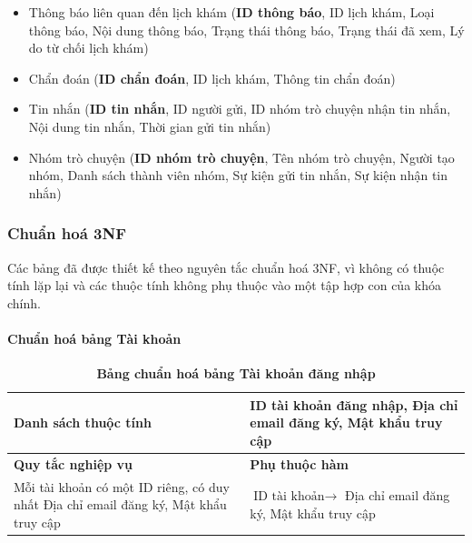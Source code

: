 \begin{itemize}
	\item Thông báo liên quan đến lịch khám (\textbf{ID thông báo}, ID lịch khám, Loại thông báo, Nội dung thông báo, Trạng thái thông báo, Trạng thái đã xem, Lý do từ chối lịch khám)
	\item Chẩn đoán (\textbf{ID chẩn đoán}, ID lịch khám, Thông tin chẩn đoán)
	\item Tin nhắn (\textbf{ID tin nhắn}, ID người gửi, ID nhóm trò chuyện nhận tin nhắn, Nội dung tin nhắn, Thời gian gửi tin nhắn)
	\item Nhóm trò chuyện (\textbf{ID nhóm trò chuyện}, Tên nhóm trò chuyện, Người tạo nhóm, Danh sách thành viên nhóm, Sự kiện gửi tin nhắn, Sự kiện nhận tin nhắn)

\end{itemize}

\subsubsection{Chuẩn hoá 3NF}
Các bảng đã được thiết kế theo nguyên tắc chuẩn hoá 3NF, vì không có thuộc tính lặp lại và các thuộc tính không phụ thuộc vào một tập hợp con của khóa chính.

\paragraph{Chuẩn hoá bảng Tài khoản}
\mbox{}
\begin{table}[H]
	\caption{\bfseries \fontsize{12pt}{0pt}\selectfont Bảng chuẩn hoá bảng Tài khoản đăng nhập}
	\centering
	\begin{tabularx}{0.9\textwidth}{|X|X|}
		\hline
		\textbf{Danh sách thuộc tính} & ID tài khoản đăng nhập, Địa chỉ email đăng ký, Mật khẩu truy cập                                   \\
		\hline
		\textbf{Quy tắc nghiệp vụ}    & \textbf{Phụ thuộc hàm}                                                                             \\
		\hline
		Mỗi tài khoản có một ID riêng, có duy nhất Địa chỉ email đăng ký, Mật khẩu truy cập
		                              & \parbox[t]{\linewidth}{$\text{ID tài khoản} \rightarrow$ Địa chỉ email đăng ký, Mật khẩu truy cập} \\
		\hline
		                                             \\
		                                                       \\
		\hline
	\end{tabularx}
\end{table}

